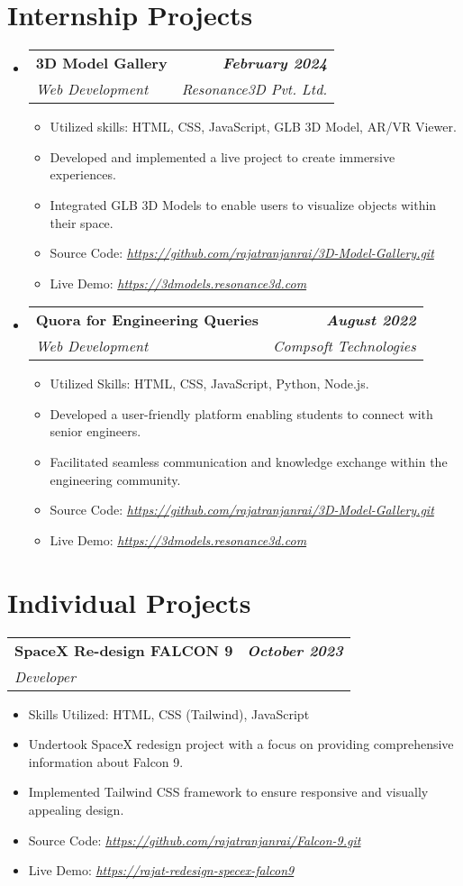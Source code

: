 \documentclass[letterpaper,11pt]{article}
\makeatletter
\newcommand{\resumeItem}[1]{
  \item\small{
    {#1 \vspace{-2pt}}
  }
}
\newcommand{\resumeSubheading}[4]{
  \vspace{-2pt}\item
    \begin{tabular*}{1.0\textwidth}[t]{l@{\extracolsep{\fill}}r}
      \textbf{#1} & \textbf{\small #2} \\
      \textit{\small#3} & \textit{\small #4} \\
    \end{tabular*}\vspace{-7pt}
}
\newcommand{\resumeSubHeadingListStart}{\begin{itemize}[leftmargin=0.0in, label={}]}
\newcommand{\resumeSubHeadingListEnd}{\end{itemize}}
\newcommand{\resumeItemListStart}{\begin{itemize}}
\newcommand{\resumeItemListEnd}{\end{itemize}\vspace{-5pt}}
\makeatother
\begin{document}
\section{Internship Projects}
\resumeSubHeadingListStart

\vspace{5pt}
\resumeSubheading
{3D Model Gallery}{\textit{February 2024}}
{Web Development}{Resonance3D Pvt. Ltd.}
\resumeItemListStart
    \resumeItem{Utilized skills: HTML, CSS, JavaScript, GLB 3D Model, AR/VR Viewer.}
    \resumeItem{Developed and implemented a live project to create immersive experiences.}
    \resumeItem{Integrated GLB 3D Models to enable users to visualize objects within their space.}
    \resumeItem{Source Code: \href{https://github.com/rajatranjanrai/3D-Model-Gallery.git}{\textit{https://github.com/rajatranjanrai/3D-Model-Gallery.git}}}
    \resumeItem{Live Demo: \href{https://3dmodels.resonance3d.com}{\textit{https://3dmodels.resonance3d.com}}}
\resumeItemListEnd

\vspace{5pt}
\resumeSubheading
{Quora for Engineering Queries}{\textit{August 2022}}
{Web Development}{Compsoft Technologies}
\resumeItemListStart
    \resumeItem{Utilized Skills: HTML, CSS, JavaScript, Python, Node.js.} \\
    \resumeItem{Developed a user-friendly platform enabling students to connect with senior engineers.} \\
    \resumeItem{Facilitated seamless communication and knowledge exchange within the engineering community.} \\
    \resumeItem{Source Code: \href{https://github.com/rajatranjanrai/3D-Model-Gallery.git}{\textit{https://github.com/rajatranjanrai/3D-Model-Gallery.git}}} \\
    \resumeItem{Live Demo: \href{https://3dmodels.resonance3d.com}{\textit{https://3dmodels.resonance3d.com}}}
\resumeItemListEnd

\resumeSubHeadingListEnd
\vspace{-5pt}


\section{Individual Projects}
    \vspace{5pt}
    \resumeSubheading
          {SpaceX Re-design  FALCON 9}{\textit{October 2023}}
          {Developer}{}
          \resumeItemListStart
            \resumeItem{Skills Utilized: HTML, CSS (Tailwind), JavaScript}
            \resumeItem{Undertook SpaceX redesign project with a focus on providing comprehensive information about Falcon 9.}
            \resumeItem{Implemented Tailwind CSS framework to ensure responsive and visually appealing design.}
            \resumeItem{Source Code: \href{https://github.com/rajatranjanrai/Falcon-9.git}{\textit{https://github.com/rajatranjanrai/Falcon-9.git}}}
            \resumeItem{Live Demo: \href{https://rajatranjan-falcon-9.netlify.app}
            {\textit{https://rajat-redesign-specex-falcon9}}}
          \resumeItemListEnd
    \vspace{5pt}
\end{document}
